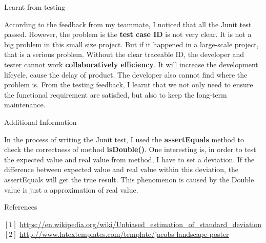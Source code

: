 \documentclass[final]{beamer}
\newlength{\onecolwid}
\begin{document}
\begin{frame}[t]
\begin{columns}[t]
\begin{column}{\onecolwid}
\begin{block}{Learnt from testing}

According to the feedback from my teammate, I noticed that all the Junit test passed. However, the problem is the \textbf{test case ID} is not very clear. It is not a big problem in this small size project. But if it happened in a large-scale project, that is a serious problem. Without the clear traceable ID, the developer and tester cannot work \textbf{collaboratively efficiency}. It will increase the development lifcycle, cause the delay of product. The developer also cannot find where the problem is. From the testing feedback, I learnt that we not only need to ensure the functional requirement are satisfied, but also to keep the long-term maintenance.

\end{block}


\begin{block}{Additional Information}

In the process of writing the Junit test, I used the \textbf{assertEquals} method to check the correctness of method \textbf{isDouble()}. One interesting is, in order to test the expected value and real value from method, I have to set a deviation. If the difference between expected value and real value within this deviation, the assertEquals will get the true result. This phenomenon is caused by the Double value is just a approximation of real value.

\end{block}


\begin{block}{References}

$\left[1\right]$ \url{https://en.wikipedia.org/wiki/Unbiased_estimation_of_standard_deviation} \\
$\left[2\right]$ \url{http://www.latextemplates.com/template/jacobs-landscape-poster}

\end{block}



\end{column}
\end{columns}
\end{frame}
\end{document}
